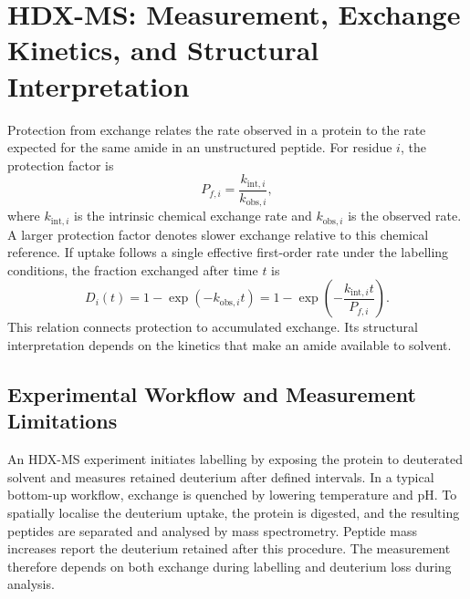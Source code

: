 \section{HDX-MS: Measurement, Exchange Kinetics, and Structural Interpretation}
\label{sec:bg-hdx}

Protection from exchange relates the rate observed in a protein to the rate expected for the same amide in an unstructured peptide. For residue $i$, the protection factor is
\begin{equation}
    P_{f,i}=\frac{k_{\text{int},i}}{k_{\text{obs},i}},
    \label{eq:bg-protection-factor}
\end{equation}
where $k_{\text{int},i}$ is the intrinsic chemical exchange rate and $k_{\text{obs},i}$ is the observed rate. A larger protection factor denotes slower exchange relative to this chemical reference.\supercite{skinnerProteinHydrogenExchange2012} If uptake follows a single effective first-order rate under the labelling conditions, the fraction exchanged after time $t$ is
\begin{equation}
    D_i(t)=1-\exp\!\left(-k_{\text{obs},i}t\right)
          =1-\exp\!\left(-\frac{k_{\text{int},i}t}{P_{f,i}}\right).
    \label{eq:bg-residue-uptake}
\end{equation}
This relation connects protection to accumulated exchange. Its structural interpretation depends on the kinetics that make an amide available to solvent.\supercite{bradshawInterpretationHDXData2020}

\subsection{Experimental Workflow and Measurement Limitations}
\label{sec:bg-hdx-workflow}

An HDX-MS experiment initiates labelling by exposing the protein to deuterated solvent and measures retained deuterium after defined intervals. In a typical bottom-up workflow, exchange is quenched by lowering temperature and pH. To spatially localise the deuterium uptake, the protein is digested, and the resulting peptides are separated and analysed by mass spectrometry. Peptide mass increases report the deuterium retained after this procedure. The measurement therefore depends on both exchange during labelling and deuterium loss during analysis.\supercite{massonRecommendationsPerformingInterpreting2019,vinciauskaiteFundamentalsHDXMS2023}

